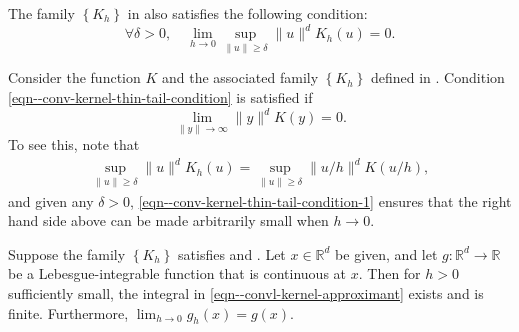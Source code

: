 \begin{assumption}
\label{asm--convl-kernel-conv-thin-tail}
The family \(\left\{ K_{h} \right\}\) in
 also satisfies the following condition:
\begin{equation}
  \forall \delta > 0, \quad
  \lim_{h \to 0} \sup_{\|u\| \geq \delta} \|u\|^{d} K_{h} (u) = 0.
  \label{eqn--conv-kernel-thin-tail-condition}
\end{equation}
\end{assumption}

\begin{remark}
Consider the function \(K\) and the associated family \(\left\{ K_{h} \right\}\)
defined in .
Condition \eqref{eqn--conv-kernel-thin-tail-condition} is satisfied if
\begin{equation}
  \lim_{\|y\| \to \infty} \|y\|^{d} K (y) = 0.
  \label{eqn--conv-kernel-thin-tail-condition-1}
\end{equation}
To see this, note that
\begin{align*}
  \sup_{\|u\| \geq \delta} \|u\|^{d} K_{h} (u) = \sup_{\|u\| \geq \delta} \| u /
  h \|^{d} K (u / h),
\end{align*}
and given any \(\delta > 0\), \eqref{eqn--conv-kernel-thin-tail-condition-1}
ensures that the right hand side above can be made arbitrarily small when \(h
\to 0\).
\end{remark}

\begin{theorem}
\label{thm--convl-kernel-conv-thin-tail}
Suppose the family \(\left\{ K_{h} \right\}\) satisfies
 and .
Let \(x \in \mathbb{R}^{d}\) be given, and let \(g : \mathbb{R}^{d} \to
\mathbb{R}\) be a Lebesgue-integrable function that is continuous at \(x\).
Then for \(h > 0\) sufficiently small, the integral in
\eqref{eqn--convl-kernel-approximant} exists and is finite.
Furthermore, \(\lim_{h \to 0} g_{h} (x) = g (x)\).
\end{theorem}

